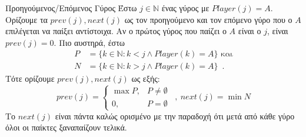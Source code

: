 {}
\begin{definitiongr}{Προηγούμενος/Επόμενος Γύρος}
  Έστω $j \in \mathbb{N}$ ένας γύρος με $Player\left(j\right) = A$. Ορίζουμε τα $prev\left(j\right), next\left(j\right)$ ως
  τον προηγούμενο και τον επόμενο γύρο που ο $A$ επιλέγεται να παίξει αντίστοιχα. Αν ο πρώτος γύρος που παίζει ο $A$ είναι ο
  $j$, είναι $prev\left(j\right) = 0$. Πιο αυστηρά, έστω
  \begin{align*}
    P &= \{k \in \mathbb{N} : k < j \wedge Player\left(k\right) = A\} \mbox{ και} \\
    N &= \{k \in \mathbb{N} : k > j \wedge Player\left(k\right) = A\} \enspace.
  \end{align*}
  Τότε ορίζουμε $prev\left(j\right), next\left(j\right)$ ως εξής:
  \begin{equation*}
    prev\left(j\right) = \begin{cases}
      \max{P}, & P \neq \emptyset \\
      0, & P = \emptyset
    \end{cases} \enspace, \:
    next\left(j\right) = \min{N}
  \end{equation*}
  Το $next\left(j\right)$ είναι πάντα καλώς ορισμένο με την παραδοχή ότι μετά από κάθε γύρο όλοι οι παίκτες ξαναπαίζουν
  τελικά.
\end{definitiongr}
